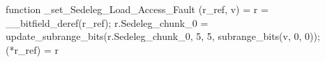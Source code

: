 function _set_Sedeleg_Load_Access_Fault (r_ref, v) = {
    r = __bitfield_deref(r_ref);
    r.Sedeleg_chunk_0 = update_subrange_bits(r.Sedeleg_chunk_0, 5, 5, subrange_bits(v, 0, 0));
    (*r_ref) = r
}
